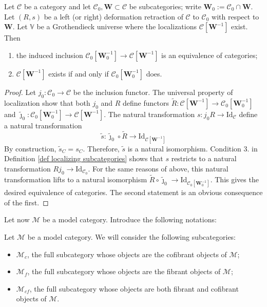 \begin{refsection}
\begin{prop} \label{prop localizing subcategories}
Let $\mathcal C$ be a category and let $\mathcal C_0, \mathbf W \subset \mathcal C$ be subcategories; write $\mathbf W_0 := \mathcal C_0 \cap \mathbf W$. Let $(R,s)$ be a left (or right) deformation retraction of $\mathcal C$ to $\mathcal C_0$ with respect to $\mathbf W$. Let $\mathbb V$ be a Grothendieck universe where the localizations $\mathcal C[\mathbf W^{-1}]$ exist. Then
\begin{enumerate}
\item the induced inclusion $\mathcal C_0[\mathbf W_0^{-1}] \to \mathcal C[\mathbf W^{-1}]$ is an equivalence of categories;
\item $\mathcal C[\mathbf W^{-1}]$ exists if and only if $\mathcal C_0[\mathbf W_0^{-1}]$ does.
\end{enumerate}
\end{prop}

\begin{proof}
Let $j_0 \colon \mathcal C_0 \to \mathcal C$ be the inclusion functor. The universal property of localization show that both $j_0$ and $R$ define functors $\widetilde{R} \colon \mathcal C[\mathbf W^{-1}] \to \mathcal C_0[\mathbf W_0^{-1}]$ and $\widetilde{\jmath}_0 \colon \mathcal C_0[\mathbf W_0^{-1}] \to \mathcal C[\mathbf W^{-1}]$. The natural transformation $s \colon j_0 R \to \mathrm{Id}_{\mathcal C}$ define a natural transformation
\[
\widetilde{s} \colon \widetilde{\jmath}_0 \circ \widetilde{R} \to \mathrm{Id}_{\mathcal C[\mathbf W^{-1}]}
\]
By construction, $\widetilde{s}_C = s_C$. Therefore, $\widetilde{s}$ is a natural isomorphism. Condition 3. in Definition \ref{def localizing subcategories} shows that $s$ restricts to a natural transformation $R j_0 \to \mathrm{Id}_{\mathcal C_0}$. For the same reasons of above, this natural transformation lifts to a natural isomorphism $\widetilde{R} \circ  \widetilde{\jmath}_0 \to \mathrm{Id}_{\mathcal C_0[\mathbf W_0^{-1}]}$. This gives the desired equivalence of categories. The second statement is an obvious consequence of the first.
\end{proof}

Let now $\mathcal M$ be a model category. Introduce the following notations:

\begin{notation}
Let $\mathcal M$ be a model category. We will consider the following subcategories:
\begin{itemize}
\item $\mathcal M_c$, the full subcategory whose objects are the cofibrant objects of $\mathcal M$;
\item $\mathcal M_f$, the full subcategory whose objects are the fibrant objects of $\mathcal M$;
\item $\mathcal M_{cf}$, the full subcategory whose objects are both fibrant and cofibrant objects of $\mathcal M$.
\end{itemize}
\end{notation}


\end{refsection}
